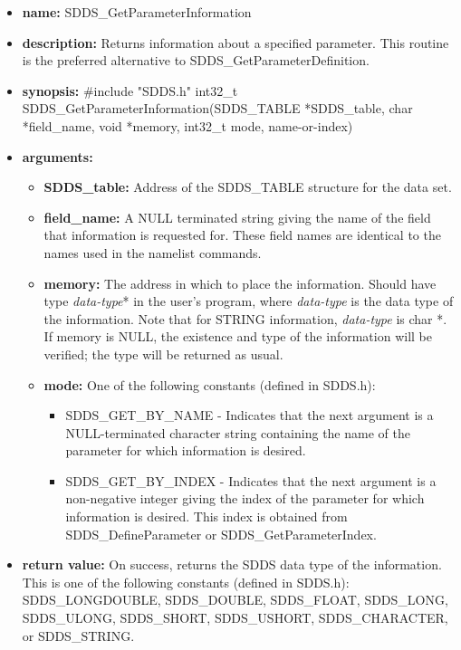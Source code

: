 \documentclass[11pt]{article}
\begin{document}
\begin{itemize}
\item {\bf name:}\newline
SDDS\_GetParameterInformation
\item {\bf description:}\newline
Returns information about a specified parameter. This routine is the preferred alternative to SDDS\_GetParameterDefinition.
\item {\bf synopsis:} \#include "SDDS.h"\newline
int32\_t SDDS\_GetParameterInformation(SDDS\_TABLE *SDDS\_table, char *field\_name, void *memory, int32\_t mode,  name-or-index)
\item {\bf arguments:}
\begin{itemize}
\item {\bf SDDS\_table:} Address of the SDDS\_TABLE structure for the data set.
\item {\bf field\_name:} A NULL terminated string giving the name of the field that information is requested for. These field names are identical to the names used in the namelist commands.
\item {\bf memory:} The address in which to place the information. Should have type {\em data-type}* in the user's program, where {\em data-type} is the data type of the information. Note that for STRING information, {\em data-type} is char *. If memory is NULL, the existence and type of the information will be verified; the type will be returned as usual.
\item {\bf mode:} One of the following constants (defined in SDDS.h):
\begin{itemize}
\item SDDS\_GET\_BY\_NAME -  Indicates that the next argument is a NULL-terminated character string containing the name of the parameter for which information is desired.
\item SDDS\_GET\_BY\_INDEX - Indicates that the next argument is a non-negative integer giving the index of the parameter for which information is desired. This index is obtained from SDDS\_DefineParameter or SDDS\_GetParameterIndex.
\end{itemize}
\end{itemize}
\item {\bf return value:}\newline
On success, returns the SDDS data type of the information. This is one of the following constants (defined in SDDS.h): SDDS\_LONGDOUBLE, SDDS\_DOUBLE, SDDS\_FLOAT, SDDS\_LONG, SDDS\_ULONG, SDDS\_SHORT, SDDS\_USHORT, SDDS\_CHARACTER, or SDDS\_STRING.\newline

\end{itemize}
\end{document}
